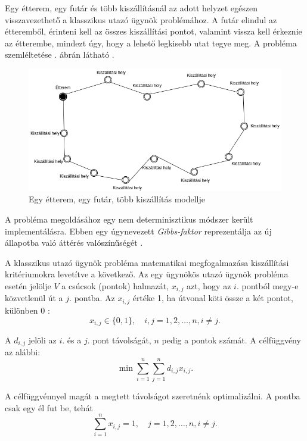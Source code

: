 

Egy étterem, egy futár és több kiszállításnál az adott helyzet egészen visszavezethető a klasszikus utazó ügynök problémához.
A futár elindul az étteremből, érinteni kell az összes kiszállítási pontot, valamint vissza kell érkeznie az étterembe, mindezt úgy, hogy a lehető legkisebb utat tegye meg.
A probléma szemléltetése . ábrán látható \cite{Diagrams.net}.

\begin{figure}[h!]
\centering
\includegraphics[scale=0.5]{images/Simpletsp.png}
\caption{Egy étterem, egy futár, több kiszállítás modellje}
\label{fig:model2}
\end{figure}


A probléma megoldásához egy nem determinisztikus módszer került implementálásra.
Ebben egy úgynevezett \textit{Gibbs-faktor} reprezentálja az új állapotba való áttérés valószí\-nű\-ségét \cite{GibbsFactor}.

A klasszikus utazó ügynök probléma matematikai megfogalmazása kiszállítási krité\-riumokra levetítve a következő.
Az egy ügynökös utazó ügynök probléma esetén jelölje $V$ a csúcsok (pontok) halmazát, $x_{i,j}$ azt, hogy az $i.$ pontból megy-e közvetlenül út a $j.$ pontba. Az $x_{i,j}$ értéke 1, ha útvonal köti össze a két pontot, különben 0 \cite{TSP}: 
\[
x_{i, j} \in \{0, 1\}, \quad i, j = 1, 2, \ldots, n, i \neq j.
\]

A $d_{i,j}$ jelöli az $i.$ és a $j.$ pont távolságát, $n$ pedig a pontok számát. A célfüggvény az alábbi:
\[
\displaystyle
\min \sum_{i=1}^n \sum_{j=1}^n d_{i,j} x_{i,j}.
\]

A célfüggvénnyel magát a megtett távolságot szeretnénk optimalizálni. A pontba csak egy él fut be, tehát
\[
\displaystyle
\sum_{i=1}^n x_{i,j} = 1, \quad j = 1, 2, \ldots, n, i \neq j.
\]

